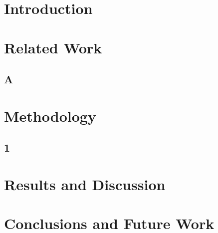 \documentclass{article}
\title{}
\date{}
\author{Jason M. Pittman\\
	University of Maryland Global Campus\\
	\texttt{https://orcid.org/0000-0002-5198-8157} \\
}
\begin{document}
\maketitle

\begin{abstract}

\end{abstract}

\keywords{}

\section{Introduction}
\label{sec:introduction}




\section{Related Work}
\label{sec:related-work}

    \subsection{A}

\section{Methodology}
    \subsection{1}

\section{Results and Discussion}

\section{Conclusions and Future Work}



\end{document}
